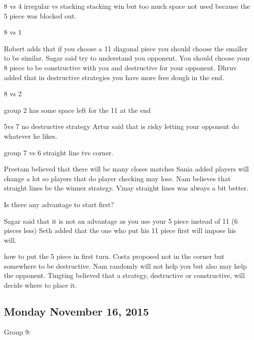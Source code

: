 8 vs 4
irregular vs stacking
stacking win but too much space not used because the 5 piece was blocked out.

8 vs 1

Robert adds that if you choose a 11 diagonal piece you should choose the smaller to be similar.
Sagar said try to understand you opponent. You should choose your 8 piece to be constructive with you and destructive for your opponent.
Dhruv added that in destructive strategies you have more free dough in the end.

8 vs 2

group 2 has some space left for the 11 at the end

5vs 7
no destructive strategy
Artur said that is risky letting your opponent do whatever he likes.

group 7 vs 6
straight line tvs corner.

Preetam believed that there will be many closes matches
Sania added players will change a lot so players that do player checking may lose.
Nam believes that straight lines be the winner strategy.
Vinay straight lines was always a bit better.

Is there any advantage to start first?

Sagar said  that it is not an advantage as you use your 5 piece instead of 11 (6 pieces less)
Seth added  that the one who put his 11 piece first will impose his will.

how to put the 5 piece in first turn.
Costa proposed not in the corner but somewhere to be destructive.
Nam randomly will not help you but also may help the opponent.
Tingting believed that a strategy, destructive or constructive, will decide where to place it.
\subsection{Monday November 16, 2015}
Group 9:











